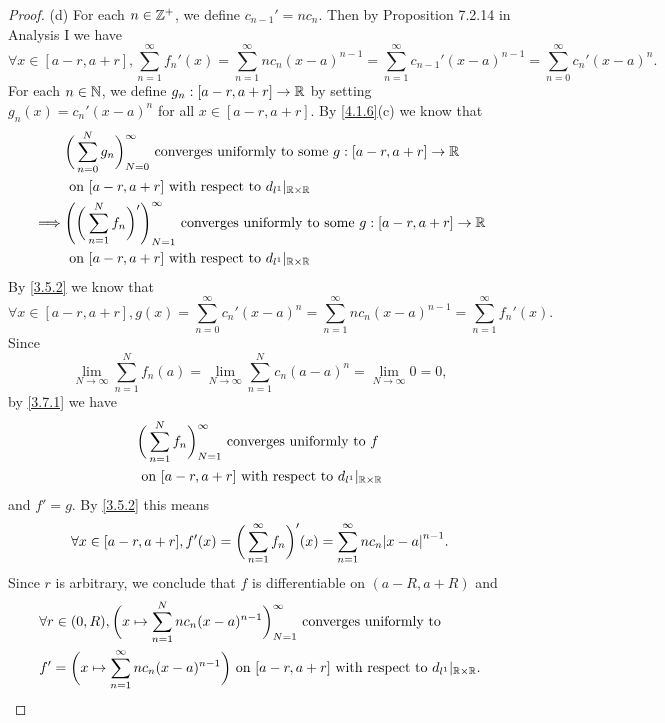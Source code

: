 \begin{proof}{(d)}
  For each \(n \in \mathbb{Z}^+\), we define \(c_{n - 1}' = n c_n\).
  Then by Proposition 7.2.14 in Analysis I we have
  \[
    \forall x \in [a - r, a + r], \sum_{n = 1}^\infty f_n'(x) = \sum_{n = 1}^\infty n c_n (x - a)^{n - 1} = \sum_{n = 1}^\infty c_{n - 1}' (x - a)^{n - 1} = \sum_{n = 0}^\infty c_n' (x - a)^n.
  \]
  For each \(n \in \mathbb{N}\), we define \(g_n : [a - r, a + r] \to \mathbb{R}\) by setting \(g_n(x) = c_n' (x - a)^n\) for all \(x \in [a - r, a + r]\).
  By \cref{4.1.6}(c) we know that
  \begin{align*}
             & \bigg(\sum_{n = 0}^N g_n\bigg)_{N = 0}^\infty \text{ converges uniformly to some } g : [a - r, a + r] \to \mathbb{R}              \\
             & \text{ on } [a - r, a + r] \text{ with respect to } d_{l^1}|_{\mathbb{R} \times \mathbb{R}}                                               \\
    \implies & \Bigg(\bigg(\sum_{n = 1}^N f_n\bigg)'\Bigg)_{N = 1}^\infty \text{ converges uniformly to some } g : [a - r, a + r] \to \mathbb{R} \\
             & \text{ on } [a - r, a + r] \text{ with respect to } d_{l^1}|_{\mathbb{R} \times \mathbb{R}}
  \end{align*}
  By \cref{3.5.2} we know that
  \[
    \forall x \in [a - r, a + r], g(x) = \sum_{n = 0}^\infty c_n' (x - a)^n = \sum_{n = 1}^\infty n c_n (x - a)^{n - 1} = \sum_{n = 1}^\infty f_n'(x).
  \]
  Since
  \[
    \lim_{N \to \infty} \sum_{n = 1}^N f_n(a) = \lim_{N \to \infty} \sum_{n = 1}^N c_n (a - a)^n = \lim_{N \to \infty} 0 = 0,
  \]
  by \cref{3.7.1} we have
  \begin{align*}
     & \bigg(\sum_{n = 1}^N f_n\bigg)_{N = 1}^\infty \text{ converges uniformly to } f \\
     & \text{ on } [a - r, a + r] \text{ with respect to } d_{l^1}|_{\mathbb{R} \times \mathbb{R}}
  \end{align*}
  and \(f' = g\).
  By \cref{3.5.2} this means
  \[
    \forall x \in [a - r, a + r], f'(x) = \bigg(\sum_{n = 1}^\infty f_n\bigg)'(x) = \sum_{n = 1}^\infty n c_n \abs{x - a}^{n - 1}.
  \]
  Since \(r\) is arbitrary, we conclude that \(f\) is differentiable on \((a - R, a + R)\) and
  \begin{align*}
     & \forall r \in (0, R), \bigg(x \mapsto \sum_{n = 1}^N n c_n (x - a)^{n - 1}\bigg)_{N = 1}^\infty \text{ converges uniformly to }                   \\
     & f' = \bigg(x \mapsto \sum_{n = 1}^\infty n c_n (x - a)^{n - 1}\bigg) \text{ on } [a - r, a + r] \text{ with respect to } d_{l^1}|_{\mathbb{R} \times \mathbb{R}}.
  \end{align*}
\end{proof}

